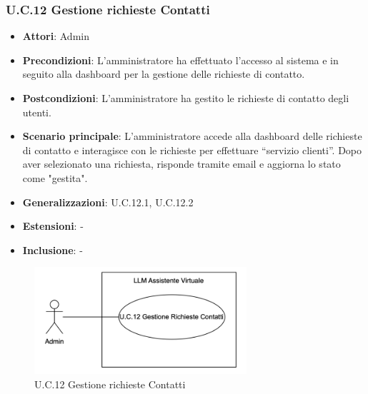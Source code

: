 \subsubsection{U.C.12 Gestione richieste Contatti}
\begin{itemize}
    \item \textbf{Attori}: Admin
    \item \textbf{Precondizioni}: L’amministratore ha effettuato l’accesso al sistema e in seguito alla dashboard per la gestione delle richieste di contatto.
    \item \textbf{Postcondizioni}: L’amministratore ha gestito le richieste di contatto degli utenti.
    \item \textbf{Scenario principale}: L’amministratore accede alla dashboard delle richieste di contatto e interagisce con le richieste per effettuare “servizio clienti”. Dopo aver selezionato una richiesta, risponde tramite email e aggiorna lo stato come "gestita".
    \item \textbf{Generalizzazioni}: U.C.12.1, U.C.12.2
    \item \textbf{Estensioni}: -
    \item \textbf{Inclusione}: -
\end{itemize}
\begin{figure}[H]
    \centering
    \includegraphics[width=0.7\textwidth]{img/UC12.png}
    \caption{U.C.12 Gestione richieste Contatti}
\end{figure}
\newpage


